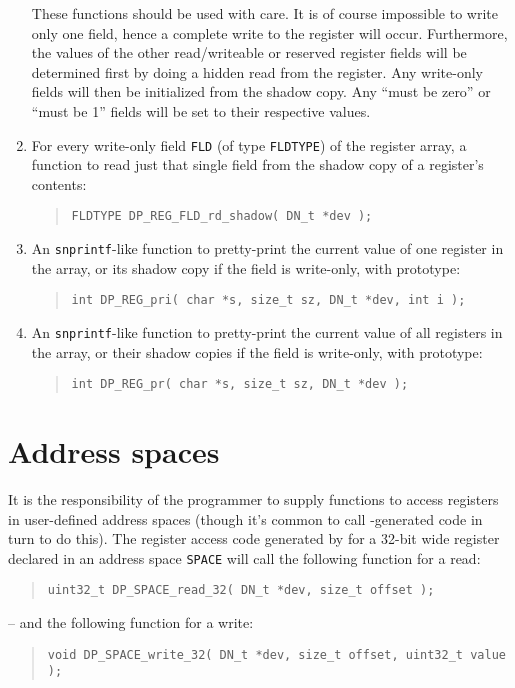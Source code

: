 \documentclass[a4paper,11pt,twoside]{report}
\begin{document}
\begin{enumerate}
  These functions should be used with care.  It is of
  course impossible to write only one field, hence a complete write to
  the register will occur.  Furthermore, the values of the other
  read/writeable or reserved register fields will be determined first
  by doing a hidden read from the register.   Any write-only 
  fields will then be initialized from the shadow copy.  Any ``must be
  zero'' or ``must be 1'' fields will be set to their respective values.  

\item For every write-only field \texttt{FLD} (of type \texttt{FLDTYPE})
  of the register array, a function to read just that single field from the
  shadow copy of a register's contents: 
  \begin{quote}
    \texttt{FLDTYPE DP\_REG\_FLD\_rd\_shadow( DN\_t *dev );}
  \end{quote}
  
\item An \texttt{snprintf}-like function to pretty-print the
  current value of one register in the array, or its shadow copy
  if the field is write-only, with prototype:
  \begin{quote}
    \texttt{int DP\_REG\_pri( char *s, size\_t sz, DN\_t *dev, int i );}
  \end{quote}
  
\item An \texttt{snprintf}-like function to pretty-print the
  current value of all registers in the array, or their shadow copies
  if the field is write-only, with prototype:
  \begin{quote}
    \texttt{int DP\_REG\_pr( char *s, size\_t sz, DN\_t *dev );}
  \end{quote}

\end{enumerate}

\section{Address spaces}\label{sec:c-spaces}

It is the responsibility of the programmer to supply functions to
access registers in user-defined address spaces (though it's common to
call \Mac{}-generated code in turn to do this).   The register access
code generated by \Mac for a 32-bit wide register declared in an
address space \texttt{SPACE} will call the following function for a
read:
  \begin{quote}
    \texttt{uint32\_t DP\_SPACE\_read\_32( DN\_t *dev, size\_t offset );}
  \end{quote}
-- and the following function for a write:
  \begin{quote}
    \texttt{void DP\_SPACE\_write\_32( DN\_t *dev, size\_t offset,
      uint32\_t value );}
  \end{quote}
\end{document}
